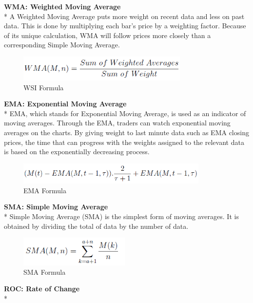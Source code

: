 \documentclass{article}
\begin{document}
\noindent
\textbf{WMA: Weighted Moving Average} \\*
A Weighted Moving Average puts more weight on recent data and less on past data. This is done by multiplying each bar’s price by a weighting factor. Because of its unique calculation, WMA will follow prices more closely than a corresponding Simple Moving Average.
\begin{figure}[H]
\begin{center}
   \includegraphics[width=85mm,scale=0.8]{assets/formulas/wma.png}
   \caption{WSI Formula}
\end{center}
\end{figure}
\noindent
\textbf{EMA: Exponential Moving Average} \\*
EMA, which stands for Exponential Moving Average, is used as an indicator of moving averages. Through the EMA, traders can watch exponential moving averages on the charts. By giving weight to last minute data such as EMA closing prices, the time that can progress with the weights assigned to the relevant data is based on the exponentially decreasing process.
\begin{figure}[H]
\begin{center}
   \includegraphics[width=95mm,scale=0.8]{assets/formulas/ema.png}
   \caption{EMA Formula}
\end{center}
\end{figure}
\noindent
\textbf{SMA: Simple Moving Average} \\*
Simple Moving Average (SMA) is the simplest form of moving averages. It is obtained by dividing the total of data by the number of data.
\begin{figure}[H]
\begin{center}
   \includegraphics[width=55mm,scale=0.8]{assets/formulas/sma.png}
   \caption{SMA Formula}
\end{center}
\end{figure}
\noindent
\textbf{ROC: Rate of Change}\\*
\end{document}
